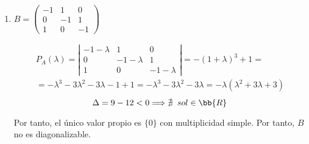 \begin{ejercicio}
\begin{enumerate}
        \item $B = \left( \begin{array}{ccc}
            -1 & 1 & 0 \\
            0  & -1 & 1 \\
            1 & 0 & -1
        \end{array}\right)$

        \begin{multline*}
            P_A(\lambda) = \left| \begin{array}{ccc}
                -1-\lambda & 1 & 0 \\
                0  & -1-\lambda & 1 \\
                1 & 0 & -1-\lambda
            \end{array}\right| = -(1+\lambda)^3+1 =  \\ = -\lambda^3 -3\lambda^2 - 3\lambda -1 + 1 = -\lambda^3 -3\lambda^2 - 3\lambda = -\lambda(\lambda^2+3\lambda+3)
        \end{multline*}
        $$\Delta = 9 - 12 <0 \Longrightarrow \nexists \;\;sol \in \bb{R}$$

        Por tanto, el único valor propio es $\{0\}$ con multiplicidad simple. Por tanto, $B$ no es diagonalizable.


\end{enumerate}
\end{ejercicio}
